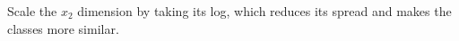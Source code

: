 \begin{answer}
Scale the $x_2$ dimension by taking its log, which reduces its spread and makes the classes more similar.
\end{answer}
